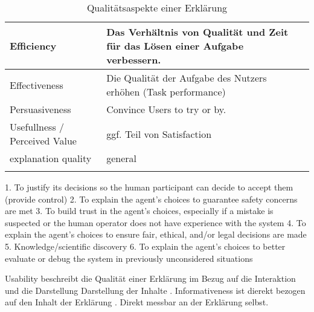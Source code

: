 \begin{longtable}{|p{}|p{}|p{}|}
    Efficiency      & Das Verhältnis von Qualität und Zeit für das Lösen einer Aufgabe verbessern. & \cite{nunes_systematic_2017} \cite{chazette_knowledge_nodate} \cite{tintarev_designing_nodate} \cite{balog_measuring_2020} \cite{tsai_evaluating_2019} \cite{tintarev2015explaining} \cite{hernandez-bocanegra_effects_2020} \cite{tintarev2007survey}\\ \hline
    Effectiveness      & Die Qualität der Aufgabe des Nutzers erhöhen (Task performance) \cite{martin_evaluating_2021} & \cite{nunes_systematic_2017} \cite{chazette_knowledge_nodate} \cite{tintarev_designing_nodate} \cite{balog_measuring_2020} \cite{tintarev2015explaining} \cite{zolotas_towards_2019} \cite{hernandez-bocanegra_effects_2020} \cite{martin_evaluating_2021} \cite{rjoob_towards_2021} \cite{tintarev2007survey} \\ \hline
    Persuasiveness      & Convince Users to try or by. \cite{balog_measuring_2020} & \cite{nunes_systematic_2017} \cite{tintarev_designing_nodate} \cite{balog_measuring_2020} \cite{sato_context_nodate} \cite{sato_context_nodate} \cite{abdulrahman_belief-based_2019} \cite{tintarev2015explaining} \cite{sato_action-triggering_2019} \cite{tintarev2007survey} \\ \hline
    Usefullness / Perceived Value & ggf. Teil von Satisfaction & \cite{sato_context_nodate} \cite{chazette_knowledge_nodate} \cite{sato_action-triggering_2019} \\ \hline
   explanation quality  & general & \cite{hernandez-bocanegra_effects_2020} \cite{kunkel_let_2019} \\ \hline
\caption{Qualitätsaspekte einer Erklärung}
\label{tab:quality_aspects_of_explanation}
\end{longtable}

1. To justify its decisions so the human participant can decide to accept them (provide control) 2. To explain the agent’s choices to guarantee safety concerns are met 3. To build trust in the agent’s choices, especially if a mistake is suspected or the human operator does not have experience with the system 4. To explain the agent’s choices to ensure fair, ethical, and/or legal decisions are made 5. Knowledge/scientific discovery 6. To explain the agent’s choices to better evaluate or debug the system in previously unconsidered situations \cite{rosenfeld_explainability_2019}

Usability beschreibt die Qualität einer Erklärung im Bezug auf die Interaktion und die Darstellung Darstellung der Inhalte \cite{chazette_end-users_nodate}. Informativeness ist dierekt bezogen auf den Inhalt der Erklärung \cite{chazette_end-users_nodate}. Direkt messbar an der Erklärung selbst.

